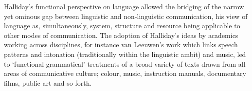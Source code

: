 
 


Halliday's functional perspective on language allowed the bridging of the narrow yet ominous gap between linguistic and non-linguistic communication, his view of language as, simultaneously, system, structure and resource being applicable to other modes of communication. The adoption of Halliday's ideas by academics working across disciplines, for instance van Leeuwen's work which links speech patterns and intonation \citep{Van-Leeuwen:1999}(traditionally within the linguistic ambit) and music, led to `functional grammatical' treatments of a broad variety of texts drawn from all areas of communicative culture; colour, music, instruction manuals, documentary films, public art \citep{OToole:1995} and so forth.


